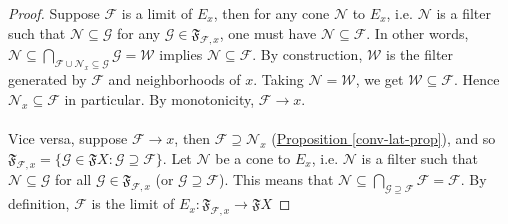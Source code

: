 \documentclass{treatise}
\begin{document}
\begin{proof}
Suppose $\mathcal{F}$ is a limit of $E_x$, then for any cone $\mathcal{N}$ to $E_x$, i.e. $\mathcal{N}$ is a filter such that $\mathcal{N} \subseteq \mathcal{G}$ for any $\mathcal{G} \in \mathfrak{F}_{\mathcal{F}, x}$, one must have $\mathcal{N} \subseteq \mathcal{F}$. In other words, $\mathcal{N} \subseteq \bigcap_{\mathcal{F} \cup \mathcal{N}_x \subseteq \mathcal{G}} \mathcal{G} = \mathcal{W}$ implies $\mathcal{N} \subseteq \mathcal{F}$. By construction, $\mathcal{W}$ is the filter generated by $\mathcal{F}$ and neighborhoods of $x$. Taking $\mathcal{N} = \mathcal{W}$, we get $\mathcal{W} \subseteq \mathcal{F}$. Hence $\mathcal{N}_x \subseteq \mathcal{F}$ in particular. By monotonicity, $\mathcal{F} \to x$.
\\
\\
Vice versa, suppose $\mathcal{F} \to x$, then $\mathcal{F} \supseteq \mathcal{N}_x$ (\hyperref[conv-lat-prop]{Proposition \ref*{conv-lat-prop}}), and so $\mathfrak{F}_{\mathcal{F}, x} = \{ \mathcal{G} \in \mathfrak{F}X : \mathcal{G} \supseteq \mathcal{F} \}$. Let $\mathcal{N}$ be a cone to $E_x$, i.e. $\mathcal{N}$ is a filter such that $\mathcal{N} \subseteq \mathcal{G}$ for all $\mathcal{G} \in \mathfrak{F}_{\mathcal{F}, x}$ (or $\mathcal{G} \supseteq \mathcal{F}$). This means that $\mathcal{N} \subseteq \bigcap_{\mathcal{G} \supseteq \mathcal{F}} \mathcal{F} = \mathcal{F}$. By definition, $\mathcal{F}$ is the limit of $E_x: \mathfrak{F}_{\mathcal{F}, x} \to \mathfrak{F}X$
\end{proof}
\end{document}
